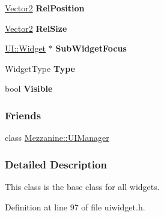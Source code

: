 \begin{DoxyCompactItemize}
\item 
\hypertarget{classMezzanine_1_1UI_1_1Widget_a900aff3bdaae26330d3d1573069ed041}{
\hyperlink{classMezzanine_1_1Vector2}{Vector2} {\bfseries RelPosition}}
\label{classMezzanine_1_1UI_1_1Widget_a900aff3bdaae26330d3d1573069ed041}

\item 
\hypertarget{classMezzanine_1_1UI_1_1Widget_ae65ab631aefe321b7635ae458c58c042}{
\hyperlink{classMezzanine_1_1Vector2}{Vector2} {\bfseries RelSize}}
\label{classMezzanine_1_1UI_1_1Widget_ae65ab631aefe321b7635ae458c58c042}

\item 
\hypertarget{classMezzanine_1_1UI_1_1Widget_aaab9e870c56a498ae0b74b66b85f1c84}{
\hyperlink{classMezzanine_1_1UI_1_1Widget}{UI::Widget} $\ast$ {\bfseries SubWidgetFocus}}
\label{classMezzanine_1_1UI_1_1Widget_aaab9e870c56a498ae0b74b66b85f1c84}

\item 
\hypertarget{classMezzanine_1_1UI_1_1Widget_a9a8e9cc0328a0e2f6849ed56920f6d07}{
WidgetType {\bfseries Type}}
\label{classMezzanine_1_1UI_1_1Widget_a9a8e9cc0328a0e2f6849ed56920f6d07}

\item 
\hypertarget{classMezzanine_1_1UI_1_1Widget_a56ab9a181ed87ea151e9be04752494da}{
bool {\bfseries Visible}}
\label{classMezzanine_1_1UI_1_1Widget_a56ab9a181ed87ea151e9be04752494da}

\end{DoxyCompactItemize}
\subsubsection*{Friends}
\begin{DoxyCompactItemize}
\item 
\hypertarget{classMezzanine_1_1UI_1_1Widget_ae6711b8bde3fabca2b5e61f955d3d13f}{
class \hyperlink{classMezzanine_1_1UI_1_1Widget_ae6711b8bde3fabca2b5e61f955d3d13f}{Mezzanine::UIManager}}
\label{classMezzanine_1_1UI_1_1Widget_ae6711b8bde3fabca2b5e61f955d3d13f}

\end{DoxyCompactItemize}


\subsubsection{Detailed Description}
This class is the base class for all widgets. 

Definition at line 97 of file uiwidget.h.



